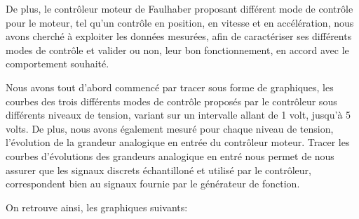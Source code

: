\documentclass[french,a4paper,12pt]{report}
\begin{document}
		De plus, le contrôleur moteur de Faulhaber proposant différent mode de contrôle pour le moteur, tel qu'un contrôle en position, en vitesse et en accélération, nous avons cherché à exploiter les données mesurées, afin de caractériser ses différents modes de contrôle et valider ou non, leur bon fonctionnement, en accord avec le comportement souhaité.
		
		Nous avons tout d'abord commencé par tracer sous forme de graphiques, les courbes des trois différents modes de contrôle proposés par le contrôleur sous différents niveaux de tension, variant sur un intervalle allant de 1 volt, jusqu'à 5 volts.
		De plus, nous avons également mesuré pour chaque niveau de tension, l'évolution de la grandeur analogique en entrée du contrôleur moteur. Tracer les courbes d'évolutions des grandeurs analogique en entré nous permet de nous assurer que les signaux discrets échantilloné et utilisé par le contrôleur, correspondent bien au signaux fournie par le générateur de fonction.
		
		On retrouve ainsi, les graphiques suivants:
		
\end{document}
